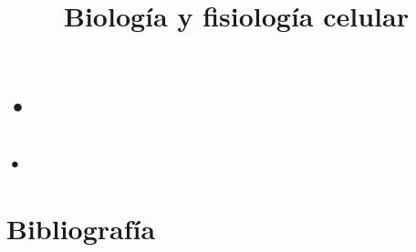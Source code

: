 \documentclass{{../slide}}
\title{Biología y fisiología celular}
\institute{Universidad Politécnica de Sinaloa}
\begin{document}
\Portada
\Indice


    \section{•}

\subsection{•}



\section{Bibliografía}

\begin{frame}
    
\end{frame}
\end{document}
